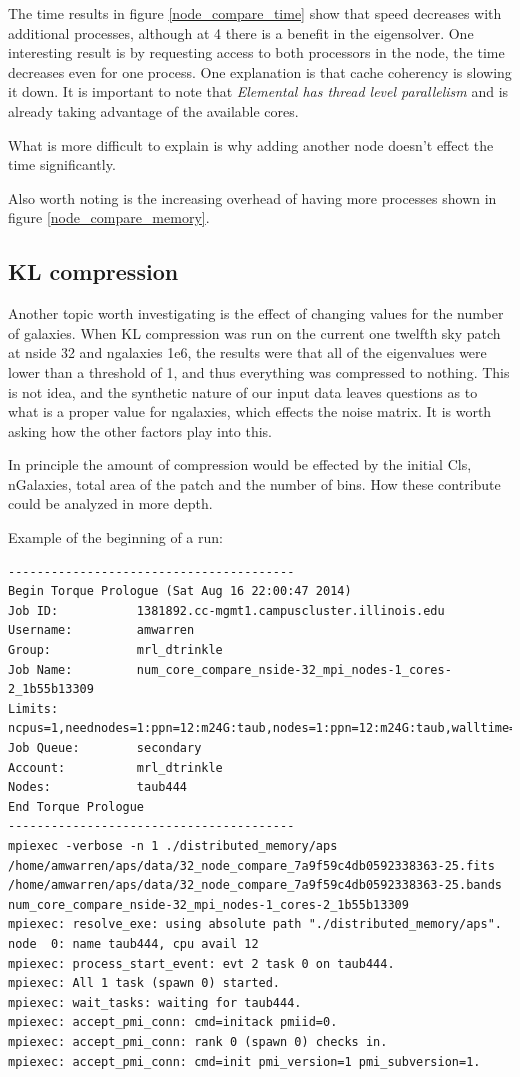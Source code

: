 \documentclass[twocolumn]{article}
\begin{document}
The time results in figure \ref{node_compare_time} show that speed decreases with additional processes, although at 4 there is a benefit in the eigensolver. One interesting result is by requesting access to both processors in the node, the time decreases even for one process. One explanation is that cache coherency is slowing it down. It is important to note that \emph{Elemental has thread level parallelism} and is already taking advantage of the available cores.

What is more difficult to explain is why adding another node doesn't effect the time significantly.

Also worth noting is the increasing overhead of having more processes shown in figure \ref{node_compare_memory}.

\subsection{KL compression}
Another topic worth investigating is the effect of changing values for the number of galaxies. When KL compression was run on the current one twelfth sky patch at nside 32 and ngalaxies 1e6, the results were that all of the eigenvalues were lower than a threshold of 1, and thus everything was compressed to nothing. This is not idea, and the synthetic nature of our input data leaves questions as to what is a proper value for ngalaxies, which effects the noise matrix. It is worth asking how the other factors play into this.

In principle the amount of compression would be effected by the initial Cls, nGalaxies, total area of the patch and the number of bins. How these contribute could be analyzed in more depth.

\newpage
Example of the beginning of a run:
\begin{verbatim}
----------------------------------------
Begin Torque Prologue (Sat Aug 16 22:00:47 2014)
Job ID:           1381892.cc-mgmt1.campuscluster.illinois.edu
Username:         amwarren
Group:            mrl_dtrinkle
Job Name:         num_core_compare_nside-32_mpi_nodes-1_cores-2_1b55b13309
Limits:           ncpus=1,neednodes=1:ppn=12:m24G:taub,nodes=1:ppn=12:m24G:taub,walltime=00:28:00
Job Queue:        secondary
Account:          mrl_dtrinkle
Nodes:            taub444
End Torque Prologue
----------------------------------------
mpiexec -verbose -n 1 ./distributed_memory/aps /home/amwarren/aps/data/32_node_compare_7a9f59c4db0592338363-25.fits /home/amwarren/aps/data/32_node_compare_7a9f59c4db0592338363-25.bands num_core_compare_nside-32_mpi_nodes-1_cores-2_1b55b13309
mpiexec: resolve_exe: using absolute path "./distributed_memory/aps".
node  0: name taub444, cpu avail 12
mpiexec: process_start_event: evt 2 task 0 on taub444.
mpiexec: All 1 task (spawn 0) started.
mpiexec: wait_tasks: waiting for taub444.
mpiexec: accept_pmi_conn: cmd=initack pmiid=0.
mpiexec: accept_pmi_conn: rank 0 (spawn 0) checks in.
mpiexec: accept_pmi_conn: cmd=init pmi_version=1 pmi_subversion=1.
\end{verbatim}
\end{document}
